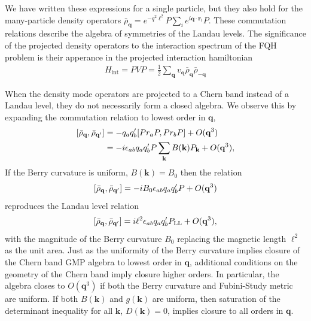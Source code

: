 \documentclass[aps,prb,twocolumn,letterpaper,twoside,nobalancelastpage,groupedaddress,amsmath,amssymb,floatfix,citeautoscript]{revtex4-1}
\begin{document}
We have written these expressions for a single particle, but they also hold for the many-particle density operators $\bar{\rho}_{\mathbf{q}} = e^{-q^2\ell^2}P\sum_{i}e^{i\mathbf{q}\cdot\mathbf{r}_i}P$. These commutation relations describe the algebra of symmetries of the Landau levels. The significance of the projected density operators to the interaction spectrum of the FQH problem is their apperance in the projected interaction hamiltonian
\begin{align}
H_{\text{int}} = PVP = \frac{1}{2}\sum_{\mathbf{q}} v_{\mathbf{q}} \bar{\rho}_{\mathbf{q}}\bar{\rho}_{-\mathbf{q}}
\end{align}

When the density mode operators are projected to a Chern band instead of a Landau level, they do not necessarily form a closed algebra\cite{parameswaran_fractional_2012}. We observe this by expanding the commutation relation to lowest order in $\mathbf{q}$,
\begin{align}
\comm{\bar{\rho}_{\mathbf{q}}}{\bar{\rho}_{\mathbf{q}'}} &= -q_a q'_b \comm{Pr_aP}{Pr_bP} + O(\mathbf{q}^3)\\
&= - i \epsilon_{ab} q_a q'_b P \sum_{\mathbf{k}} B(\mathbf{k}) P_\mathbf{k} + O(\mathbf{q}^3),
\end{align}
If the Berry curvature is uniform, $B(\mathbf{k}) = B_0$ then the relation
\begin{align}
\comm{\bar{\rho}_{\mathbf{q}}}{\bar{\rho}_{\mathbf{q}'}} = - i B_0\epsilon_{ab} q_a q'_b P + O(\mathbf{q}^3)
\end{align}
reproduces the Landau level relation
\begin{align}
\comm{\bar{\rho}_{\mathbf{q}}}{\bar{\rho}_{\mathbf{q}'}} = i \ell^2 \epsilon_{ab} q_a q'_b P_{\text{LL}} + O(\mathbf{q}^3),
\end{align}
with the magnitude of the Berry curvature $B_0$ replacing the magnetic length $\ell^2$ as the unit area. Just as the uniformity of the Berry curvature implies closure of the Chern band GMP algebra to lowest order in $\mathbf{q}$, additional conditions on the geometry of the Chern band imply closure higher orders.\cite{roy_band_2014} In particular, the algebra closes to $O(\mathbf{q}^3)$ if both the Berry curvature and Fubini-Study metric are uniform. If both $B(\mathbf{k})$ and $g(\mathbf{k})$ are uniform, then saturation of the determinant inequality for all $\mathbf{k}$, $D(\mathbf{k}) = 0$, implies closure to all orders in $\mathbf{q}$.
\end{document}

